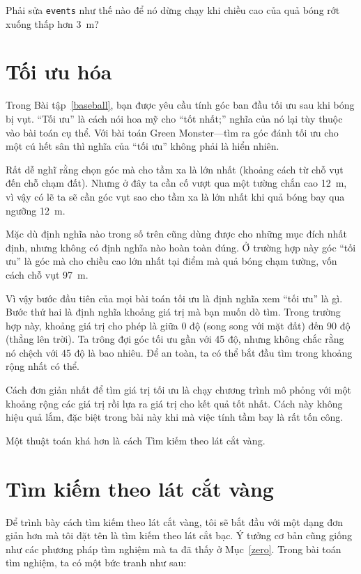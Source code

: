 \documentclass[12pt]{book}
\begin{document}
\begin{ex}
Phải sửa {\tt events} như thế nào để nó dừng chạy khi chiều cao của
quả bóng rớt xuống thấp hơn 3~m?
\end{ex}


\section{Tối ưu hóa}

Trong Bài tập~\ref{baseball}, bạn được yêu cầu tính góc ban đầu
tối ưu sau khi bóng bị vụt. ``Tối ưu'' là cách nói hoa mỹ cho
``tốt nhất;'' nghĩa của nó lại tùy thuộc vào bài toán cụ thể.
Với bài toán Green Monster---tìm ra góc đánh tối ưu cho một
cú hết sân thì nghĩa của ``tối ưu'' không phải là hiển nhiên.

Rất dễ nghĩ rằng chọn góc mà cho tầm xa là lớn nhất (khoảng cách
từ chỗ vụt đến chỗ chạm đất). Nhưng ở đây ta cần cố vượt qua một
tường chắn cao 12~m, vì vậy có lẽ ta sẽ cần góc vụt sao cho 
tầm xa là lớn nhất khi quả bóng bay qua ngưỡng 12~m.

Mặc dù định nghĩa nào trong số trên cũng dùng được cho những
mục đích nhất định, nhưng không có định nghĩa nào hoàn toàn
đúng. Ở trường hợp này góc ``tối ưu'' là góc mà cho chiều cao
lớn nhất tại điểm mà quả bóng chạm tường, vốn cách chỗ vụt 
97~m.

Vì vậy bước đầu tiên của mọi bài toán tối ưu là định nghĩa
xem ``tối ưu'' là gì. Bước thứ hai là định nghĩa khoảng giá trị
mà bạn muốn dò tìm. Trong trường hợp này, khoảng giá trị cho
phép là giữa 0 độ (song song với mặt đất) đến 90 độ (thẳng
lên trời). Ta trông đợi góc tối ưu gần với 45 độ, nhưng không
chắc rằng nó chệch với 45 độ là bao nhiêu. Để an toàn, ta có
thể bắt đầu tìm trong khoảng rộng nhất có thể.

Cách đơn giản nhất để tìm giá trị tối ưu là chạy chương trình
mô phỏng với một khoảng rộng các giá trị rồi lựa ra giá trị
cho kết quả tốt nhất. Cách này không hiệu quả lắm, đặc biệt
trong bài này khi mà việc tính tầm bay là rất tốn công.

Một thuật toán khá hơn là cách Tìm kiếm theo lát cắt vàng.

\section{Tìm kiếm theo lát cắt vàng}

Để trình bày cách tìm kiếm theo lát cắt vàng, tôi sẽ bắt đầu với một
dạng đơn giản hơn mà tôi đặt tên là tìm kiếm theo lát cắt bạc. Ý tưởng
cơ bản cũng giống như các phương pháp tìm nghiệm mà ta đã thấy ở
Mục~\ref{zero}.  Trong bài toán tìm nghiệm, ta có một bức tranh
như sau:
\end{document}
